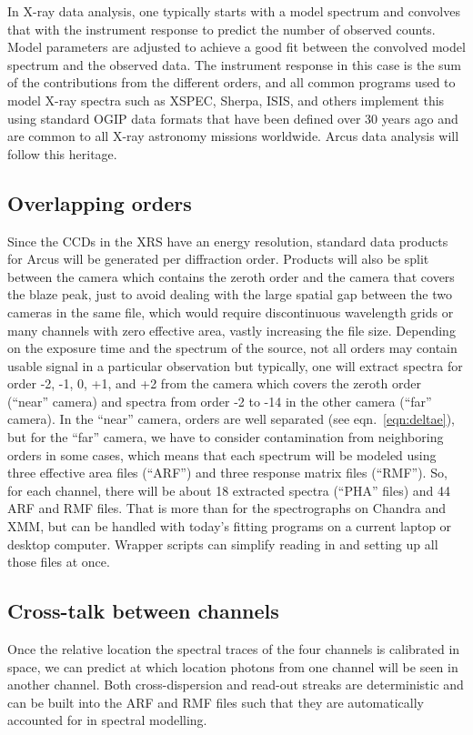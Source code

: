 \documentclass[12pt]{spieman}  %
\begin{document}
\begin{spacing}{2}
In X-ray data analysis, one typically starts with a model spectrum and convolves that with the instrument response to predict the number of observed counts. Model parameters are adjusted to achieve a good fit between the convolved model spectrum and the observed data. The instrument response in this case is the sum of the contributions from the different orders, and all common programs used to model X-ray spectra such as XSPEC\cite{1996ASPC..101...17A}, Sherpa\cite{10.1117/12.447161}, ISIS\cite{2000ASPC..216..591H}, and others implement this using standard OGIP data formats that have been defined over 30 years ago and are common to all X-ray astronomy missions worldwide\cite{1995ASPC...77..219C}.
Arcus data analysis will follow this heritage.


\subsection{Overlapping orders}
Since the CCDs in the XRS have an energy resolution, standard data products for Arcus will be generated per diffraction order. Products will also be split between the camera which contains the zeroth order and the camera that covers the blaze peak, just to avoid dealing with the large spatial gap between the two cameras in the same file, which would require discontinuous wavelength grids or many channels with zero effective area, vastly increasing the file size. Depending on the exposure time and the spectrum of the source, not all orders may contain usable signal in a particular observation but typically, one will extract spectra for order -2, -1, 0, +1, and +2 from the camera which covers the zeroth order (``near'' camera) and spectra from order -2 to -14 in the other camera (``far'' camera). In the ``near'' camera, orders are well separated (see eqn.~\ref{eqn:deltae}), but for the ``far'' camera, we have to consider contamination from neighboring orders in some cases, which means that each spectrum will be modeled using three effective area files (``ARF'') and three response matrix files (``RMF''). So, for each channel, there will be about 18 extracted spectra (``PHA'' files) and 44 ARF and RMF files. That is more than for the spectrographs on Chandra and XMM, but can be handled with today's fitting programs on a current laptop or desktop computer. Wrapper scripts can simplify reading in and setting up all those files at once.

\subsection{Cross-talk between channels}
Once the relative location the spectral traces of the four channels is calibrated in space, we can predict at which location photons from one channel will be seen in another channel. Both cross-dispersion and read-out streaks are deterministic and can be built into the ARF and RMF files such that they are automatically accounted for in spectral modelling.


\end{spacing}
\end{document}
